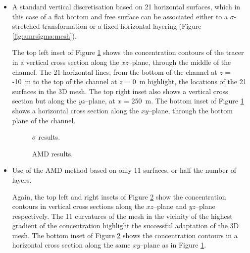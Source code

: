 \begin{itemize}
\item A standard vertical discretisation based on 21 horizontal surfaces, which
in this case of a flat bottom and free surface can be associated either to a
$\sigma$-stretched transformation or a fixed horizontal layering
(Figure \ref{fig:amrsigma:mesh}).

The top left inset of Figure \ref{fig:amr:result1} shows the
concentration contours of the tracer in a vertical cross section along the
$xz$--plane, through the middle of the channel.
The 21 horizontal lines, from the bottom of the channel at $z$ = -10~m to the top
of the channel at $z$ = 0~m highlight, the locations of the 21 surfaces in the
3D mesh.
The top right inset also shows a vertical cross section but along the $yz$--plane,
at $x$ = 250~m.
The bottom inset of Figure \ref{fig:amr:result1} shows a horizontal cross
section along the $xy$--plane, through the bottom plane of the channel.

\begin{figure}
 \caption{$\sigma$ results.}\label{fig:amr:result1}
\end{figure}

\begin{figure}
 \caption{AMD results.}\label{fig:amr:result2}
\end{figure}

\item Use of the AMD method based on only 11 surfaces, or half the number of layers.

Again, the top left and right insets of Figure \ref{fig:amr:result2} show the
concentration contours in vertical cross sections along the $xz$--plane and
$yz$--plane respectively.
The 11 curvatures of the mesh in the vicinity of the highest gradient of the
concentration highlight the successful adaptation of the 3D mesh.
The bottom inset of Figure \ref{fig:amr:result2} shows the concentration contours
in a horizontal cross section along the same $xy$--plane as in Figure
\ref{fig:amr:result1}.
\end{itemize}

